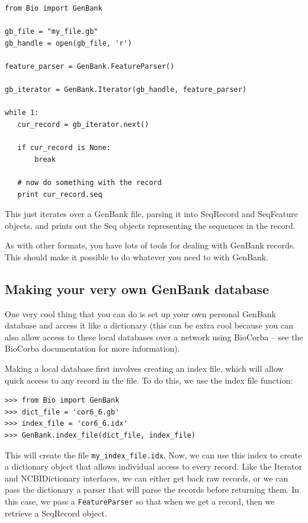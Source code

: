 \documentclass{report}
\begin{document}
\begin{verbatim}
from Bio import GenBank

gb_file = "my_file.gb"
gb_handle = open(gb_file, 'r')

feature_parser = GenBank.FeatureParser()

gb_iterator = GenBank.Iterator(gb_handle, feature_parser)

while 1:
   cur_record = gb_iterator.next()

   if cur_record is None:
       break

   # now do something with the record
   print cur_record.seq
\end{verbatim}

This just iterates over a GenBank file, parsing it into SeqRecord and SeqFeature objects, and prints out the Seq objects representing the sequences in the record.


As with other formats, you have lots of tools for dealing with GenBank records. This should make it possible to do whatever you need to with GenBank.

\subsection{Making your very own GenBank database}

One very cool thing that you can do is set up your own personal GenBank database and access it like a dictionary (this can be extra cool because you can also allow access to these local databases over a network using BioCorba -- see the BioCorba documentation for more information).


Making a local database first involves creating an index file, which will allow quick access to any record in the file. To do this, we use the index file function:

\begin{verbatim}
>>> from Bio import GenBank
>>> dict_file = 'cor6_6.gb'
>>> index_file = 'cor6_6.idx'
>>> GenBank.index_file(dict_file, index_file)
\end{verbatim}

This will create the file \verb|my_index_file.idx|. Now, we can use this index to create a dictionary object that allows individual access to every record. Like the Iterator and NCBIDictionary interfaces, we can either get back raw records, or we can pass the dictionary a parser that will parse the records before returning them. In this case, we pass a \verb|FeatureParser| so that when we get a record, then we retrieve a SeqRecord object. 
\end{document}
